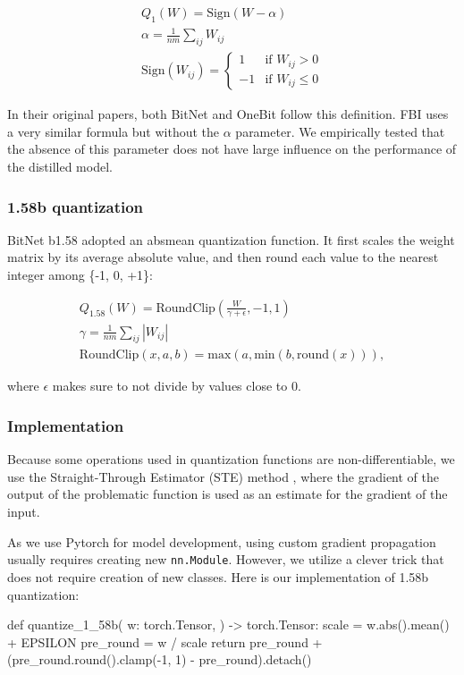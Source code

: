 \documentclass{article}
\begin{document}
\begin{gather*}
    Q_{1}(W) = \mathrm{Sign}(W - \alpha) \\
    \alpha = \frac{1}{nm}\sum_{ij}W_{ij} \\
    \mathrm{Sign}(W_{ij}) = \begin{cases}
        1& \text{if } W_{ij} > 0 \\
        -1  & \text{if } W_{ij} \le 0
    \end{cases}
\end{gather*}

In their original papers, both BitNet and OneBit follow this definition. FBI uses a very similar formula but without the \(\alpha\) parameter. We empirically tested that the absence of this parameter does not have large influence on the performance of the distilled model.


\subsubsection{1.58b quantization}

BitNet b1.58 adopted an absmean quantization function. It first scales the weight matrix by its average absolute value, and then round each value to
the nearest integer among \{-1, 0, +1\}:

\begin{gather*}
    Q_{1.58}(W) = \mathrm{RoundClip}(\frac{W}{\gamma + \epsilon}, -1, 1) \\
    \gamma = \frac{1}{nm}\sum_{ij}\left| W_{ij} \right| \\
    \mathrm{RoundClip}(x, a, b) = \mathrm{max}(a, \mathrm{min}(b, \mathrm{round}(x))),
\end{gather*}

where \(\epsilon\) makes sure to not divide by values close to \(0\).

\subsubsection{Implementation}

Because some operations used in quantization functions are non-differentiable, we use the Straight-Through Estimator (STE) method \cite{ste}, where the gradient of the output of the problematic function is used as an estimate for the gradient of the input.

As we use Pytorch for model development, using custom gradient propagation usually requires creating new \texttt{nn.Module}. However, we utilize a clever trick that does not require creation of new classes. Here is our implementation of 1.58b quantization:
\\
\begin{python}
def quantize_1_58b(
    w: torch.Tensor,
) -> torch.Tensor:
    scale = w.abs().mean() + EPSILON
    pre_round = w / scale
    return pre_round + (pre_round.round().clamp(-1, 1) - pre_round).detach()
\end{python}
\end{document}
